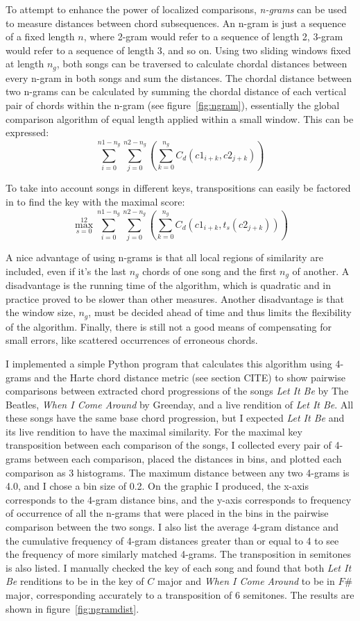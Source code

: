 To attempt to enhance the power of localized comparisons, \textit{n-grams} can be used to measure distances between chord subsequences. An n-gram is just a sequence of a fixed length $n$, where 2-gram would refer to a sequence of length 2, 3-gram would refer to a sequence of length 3, and so on. Using two sliding windows fixed at length $n_g$, both songs can be traversed to calculate chordal distances between every n-gram in both songs and sum the distances. The chordal distance between two n-grams can be calculated by summing the chordal distance of each vertical pair of chords within the n-gram (see figure~\ref{fig:ngram}), essentially the global comparison algorithm of equal length applied within a small window. This can be expressed: \[\sum_{i=0}^{n1 - n_g} \sum_{j=0}^{n2 - n_g} \left( \sum_{k=0}^{n_g} C_d({c1}_{i+k}, {c2}_{j+k}) \right) \]

To take into account songs in different keys, transpositions can easily be factored in to find the key with the maximal score: \[\max_{s=0}^{12} \sum_{i=0}^{n1 - n_g} \sum_{j=0}^{n2 - n_g} \left( \sum_{k=0}^{n_g} C_d({c1}_{i+k}, t_s({c2}_{j+k})) \right) \]

A nice advantage of using n-grams is that all local regions of similarity are included, even if it's the last $n_g$ chords of one song and the first $n_g$ of another. A disadvantage is the running time of the algorithm, which is quadratic and in practice proved to be slower than other measures. Another disadvantage is that the window size, $n_g$, must be decided ahead of time and thus limits the flexibility of the algorithm. Finally, there is still not a good means of compensating for small errors, like scattered occurrences of erroneous chords.

I implemented a simple Python program that calculates this algorithm using 4-grams and the Harte chord distance metric (see section CITE) to show pairwise comparisons between extracted chord progressions of the songs \textit{Let It Be} by The Beatles, \textit{When I Come Around} by Greenday, and a live rendition of \textit{Let It Be}. All these songs have the same base chord progression, but I expected \textit{Let It Be} and its live rendition to have the maximal similarity. For the maximal key transposition between each comparison of the songs, I collected every pair of 4-grams between each comparison, placed the distances in bins, and plotted each comparison as 3 histograms. The maximum distance between any two 4-grams is 4.0, and I chose a bin size of 0.2. On the graphic I produced, the x-axis corresponds to the 4-gram distance bins, and the y-axis corresponds to frequency of occurrence of all the n-grams that were placed in the bins in the pairwise comparison between the two songs. I also list the average 4-gram distance and the cumulative frequency of 4-gram distances greater than or equal to 4 to see the frequency of more similarly matched 4-grams. The transposition in semitones is also listed. I manually checked the key of each song and found that both \textit{Let It Be} renditions to be in the key of $C$ major and \textit{When I Come Around} to be in $F\#$ major, corresponding accurately to a transposition of $6$ semitones. The results are shown in figure~\ref{fig:ngramdist}.